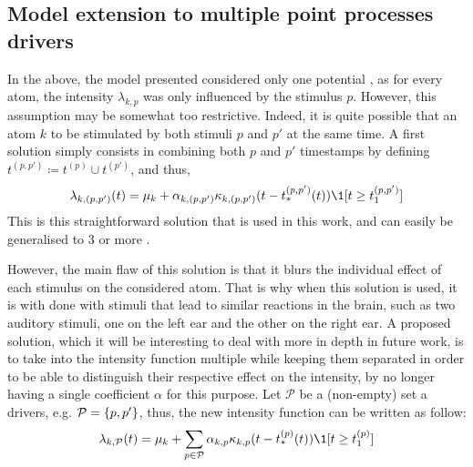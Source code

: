 \subsection{Model extension to multiple point processes drivers}\label{model_extension_multiple_pp}

In the above, the model presented considered only one potential , as for every atom, the intensity $\lambda_{k,p}$ was only influenced by the stimulus $p$.
However, this assumption may be somewhat too restrictive.
Indeed, it is quite possible that an atom $k$ to be stimulated by both stimuli $p$ and $p'$ at the same time.
A first solution simply consists in combining both $p$ and $p'$ timestamps by defining $t^{(p, p')} \coloneqq t^{(p)} \cup t^{(p')}$, and thus,
\begin{equation}\label{eq:intensity_combined_stimuli}
    \lambda_{k,(p, p')}(t)  = \mu_k + \alpha_{k,(p, p')}\kappa_{k,(p, p')}(t - t_*^{(p, p')}(t))\1[t \geq t_1^{(p, p')}]
\end{equation}
This is this straightforward solution that is used in this work, and can easily be generalised to 3 or more .

However, the main flaw of this solution is that it blurs the individual effect of each stimulus on the considered atom.
That is why when this solution is used, it is with done with stimuli that lead to similar reactions in the brain, such as two auditory stimuli, one on the left ear and the other on the right ear.
A proposed solution, which it will be interesting to deal with more in depth in future work, is to take into the intensity function multiple  while keeping them separated in order to be able to distinguish their respective effect on the intensity, by no longer having a single coefficient $\alpha$ for this purpose.
Let $\mathcal{P}$ be a (non-empty) set a drivers, e.g. $\mathcal{P} = \left\lbrace p, p' \right\rbrace$, thus, the new intensity function can be written as follow:
\begin{equation}
    \lambda_{k,\mathcal{P}}(t)  = \mu_k + \sum_{p\in\mathcal{P}} \alpha_{k,p}\kappa_{k,p}(t - t_*^{(p)}(t))\1[t \geq t_1^{(p)}]
\end{equation}

